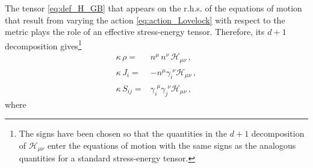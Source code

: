 \documentclass[reprint,aps,amsmath,amssymb,twoside,prd,showkeys,superscriptaddress,nofootinbib]{revtex4-2}
\begin{document}
The tensor \eqref{eq:def_H_GB} that appears on the r.h.s. of the equations of motion that result from varying the action \eqref{eq:action_Lovelock} with respect to the metric plays the role of an effective stress-energy tensor. Therefore, its $d+1$ decomposition gives\footnote{The signs have been chosen so that the quantities in the $d+1$ decomposition of $\mathcal{H}_{\mu\nu}$ enter the equations of motion with the same signs as the analogous quantities for a standard stress-energy tensor.}
\begin{subequations}
    \begin{eqnarray}
        \kappa\,\rho =&n^\mu\,n^\nu\,\mathcal{H}_{\mu\nu}\,,\\
        \kappa\,J_i =&-n^{\mu}\gamma_i^{\phantom{i}\nu}{\mathcal H}_{\mu\nu}\,,\\
        \kappa\,S_{ij} = &\gamma_i^{\phantom{i}\mu}\gamma_j^{\phantom{j}\nu}\mathcal{H}_{\mu\nu}\,,
    \end{eqnarray}
\end{subequations}
where 
\end{document}
